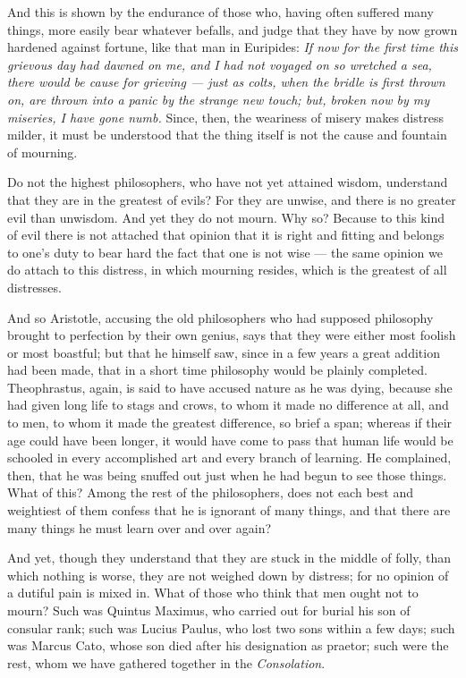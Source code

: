  And this is shown by the endurance of those who, having often suffered many things, more easily bear whatever befalls, and judge that they have by now grown hardened against fortune, like that man in Euripides: \textit{If now for the first time this grievous day had dawned on me, and I had not voyaged on so wretched a sea, there would be cause for grieving — just as colts, when the bridle is first thrown on, are thrown into a panic by the strange new touch; but, broken now by my miseries, I have gone numb.} Since, then, the weariness of misery makes distress milder, it must be understood that the thing itself is not the cause and fountain of mourning.

 Do not the highest philosophers, who have not yet attained wisdom, understand that they are in the greatest of evils? For they are unwise, and there is no greater evil than unwisdom. And yet they do not mourn. Why so? Because to this kind of evil there is not attached that opinion that it is right and fitting and belongs to one's duty to bear hard the fact that one is not wise — the same opinion we do attach to this distress, in which mourning resides, which is the greatest of all distresses.

 And so Aristotle, accusing the old philosophers who had supposed philosophy brought to perfection by their own genius, says that they were either most foolish or most boastful; but that he himself saw, since in a few years a great addition had been made, that in a short time philosophy would be plainly completed. Theophrastus, again, is said to have accused nature as he was dying, because she had given long life to stags and crows, to whom it made no difference at all, and to men, to whom it made the greatest difference, so brief a span; whereas if their age could have been longer, it would have come to pass that human life would be schooled in every accomplished art and every branch of learning. He complained, then, that he was being snuffed out just when he had begun to see those things. What of this? Among the rest of the philosophers, does not each best and weightiest of them confess that he is ignorant of many things, and that there are many things he must learn over and over again?

 And yet, though they understand that they are stuck in the middle of folly, than which nothing is worse, they are not weighed down by distress; for no opinion of a dutiful pain is mixed in. What of those who think that men ought not to mourn? Such was Quintus Maximus, who carried out for burial his son of consular rank; such was Lucius Paulus, who lost two sons within a few days; such was Marcus Cato, whose son died after his designation as praetor; such were the rest, whom we have gathered together in the \textit{Consolation}.

